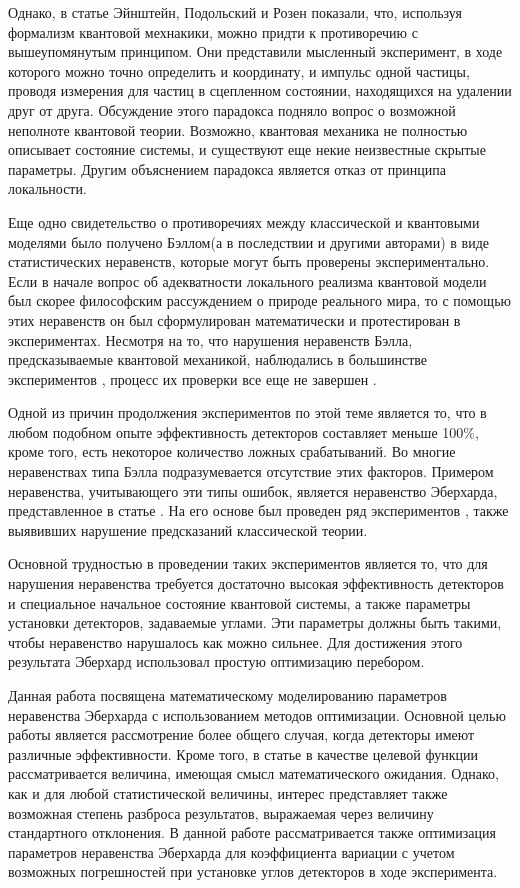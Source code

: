 \documentclass[%
master,         %
subf,           %
href,           %
colorlinks=true %
]{disser}
\numberwithin{equation}{section}
\numberwithin{figure}{section}
\begin{document}
Однако, в статье \cite{EPR} Эйнштейн, Подольский и Розен показали, что, используя формализм квантовой мехнакики, можно придти к противоречию с вышеупомянутым принципом. Они представили мысленный эксперимент, в ходе которого можно точно определить и координату, и импульс одной частицы, проводя измерения для частиц в сцепленном состоянии, находящихся на удалении друг от друга. Обсуждение этого парадокса подняло вопрос о возможной неполноте квантовой теории. Возможно, квантовая механика не полностью описывает состояние системы, и существуют еще некие неизвестные скрытые параметры. Другим объяснением парадокса является отказ от принципа локальности.

Еще одно свидетельство о противоречиях между классической и квантовыми моделями было получено Бэллом(а в последствии и другими авторами) в виде статистических неравенств, которые могут быть проверены экспериментально. Если в начале вопрос об адекватности локального реализма квантовой модели был скорее философским рассуждением о природе реального мира, то с помощью этих неравенств он был сформулирован математически и протестирован в экспериментах. Несмотря на то, что нарушения неравенств Бэлла, предсказываемые квантовой механикой, наблюдались в большинстве экспериментов \cite{ASP1}, процесс их проверки все еще не завершен \cite{Khrennikov_preprint}.

Одной из причин продолжения экспериментов по этой теме является то, что в любом подобном опыте эффективность детекторов составляет меньше 100\%, кроме того, есть некоторое количество ложных срабатываний. Во многие неравенствах типа Бэлла подразумевается отсутствие этих факторов. Примером неравенства, учитывающего эти типы ошибок, является неравенство Эберхарда, представленное в статье \cite{Eberhard}. На его основе был проведен ряд экспериментов \cite{Zeilinger}, также выявивших нарушение предсказаний классической теории.

Основной трудностью в проведении таких экспериментов является то, что для нарушения неравенства требуется достаточно высокая эффективность детекторов и специальное начальное состояние квантовой системы, а также параметры установки детекторов, задаваемые углами. Эти параметры должны быть такими, чтобы неравенство нарушалось как можно сильнее. Для достижения этого результата Эберхард использовал простую оптимизацию перебором.

Данная работа посвящена математическому моделированию параметров неравенства Эберхарда с использованием методов оптимизации. Основной целью работы является рассмотрение более общего случая, когда детекторы имеют различные эффективности. Кроме того, в статье \cite{Eberhard} в качестве целевой функции рассматривается величина, имеющая смысл математического ожидания. Однако, как и для любой статистической величины, интерес представляет также возможная степень разброса результатов, выражаемая через величину стандартного отклонения. В данной работе рассматривается также оптимизация параметров неравенства Эберхарда для коэффициента вариации с учетом возможных погрешностей при установке углов детекторов в ходе эксперимента.
\end{document}
